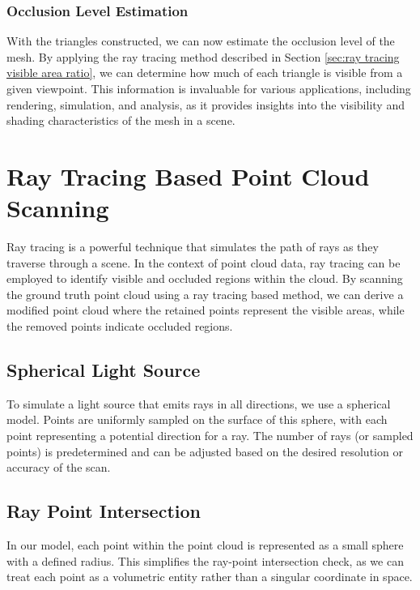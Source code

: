 \documentclass[11pt, a4paper,oneside,chapterprefix=false]{scrbook}
\begin{document}
\subsubsection{Occlusion Level Estimation}

With the triangles constructed, we can now estimate the occlusion level of the mesh. By applying the ray tracing method described in Section \ref{sec:ray tracing visible area ratio}, we can determine how much of each triangle is visible from a given viewpoint. This information is invaluable for various applications, including rendering, simulation, and analysis, as it provides insights into the visibility and shading characteristics of the mesh in a scene.


\section{Ray Tracing Based Point Cloud Scanning} \label{sec:ray tracing point cloud scanning}

Ray tracing is a powerful technique that simulates the path of rays as they traverse through a scene. In the context of point cloud data, ray tracing can be employed to identify visible and occluded regions within the cloud. By scanning the ground truth point cloud using a ray tracing based method, we can derive a modified point cloud where the retained points represent the visible areas, while the removed points indicate occluded regions.

\subsection{Spherical Light Source}

To simulate a light source that emits rays in all directions, we use a spherical model. Points are uniformly sampled on the surface of this sphere, with each point representing a potential direction for a ray. The number of rays (or sampled points) is predetermined and can be adjusted based on the desired resolution or accuracy of the scan.

\subsection{Ray Point Intersection}

In our model, each point within the point cloud is represented as a small sphere with a defined radius. This simplifies the ray-point intersection check, as we can treat each point as a volumetric entity rather than a singular coordinate in space.
\end{document}
